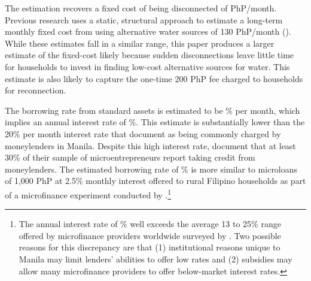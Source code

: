 \documentclass[12pt]{article}
\begin{document}
The estimation recovers a fixed cost of being disconnected of PhP/month.  Previous research uses a static, structural approach to estimate a long-term monthly fixed cost from using alternative water sources of 130 PhP/month (\cite{wjv}).  While these estimates fall in a similar range, this paper produces a larger estimate of the fixed-cost likely because sudden disconnections leave little time for households to invest in finding low-cost alternative sources for water.  This estimate is also likely to capture the one-time 200 PhP fee charged to households for reconnection.

The borrowing rate from standard assets is estimated to be \unskip\% per month, which implies an annual interest rate of \unskip\%.  This estimate is substantially lower than the 20\% per month interest rate that \cite{karlan2009expanding} document as being commonly charged by moneylenders in Manila.  Despite this high interest rate, \cite{karlan2009expanding} document that at least 30\% of their sample of microentrepreneurs report taking credit from moneylenders.  The estimated borrowing rate of \unskip\% is more similar to microloans of 1,000 PhP at 2.5\% monthly interest offered to rural Filipino households as part of a microfinance experiment conducted by \cite{gine2014group}.\footnote{The annual interest rate of \unskip\% well exceeds the average 13 to 25\% range offered by microfinance providers worldwide surveyed by \cite{cull2009microfinance}.  Two possible reasons for this discrepancy are that (1) institutional reasons unique to Manila may limit lenders' abilities to offer low rates and (2) subsidies may allow many microfinance providers to offer below-market interest rates.}
\end{document}
